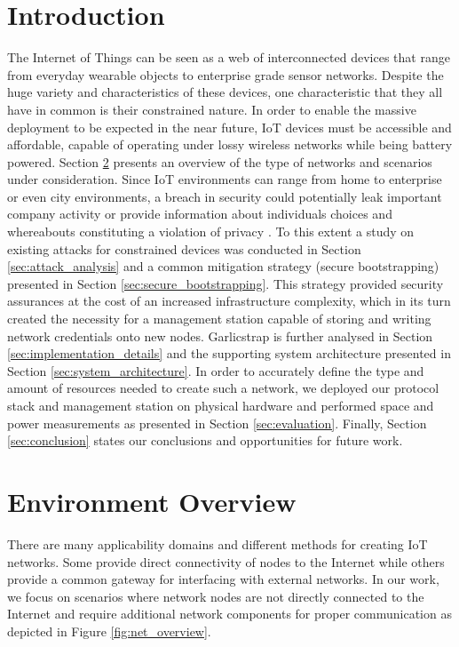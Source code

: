\documentclass{llncs}
\begin{document}
\section{Introduction}
The Internet of Things can be seen as a web of interconnected devices that range from everyday wearable objects to enterprise grade sensor networks. 
Despite the huge variety and characteristics of these devices, one characteristic that they all have in common is their constrained nature. 
In order to enable the massive deployment to be expected in the near future, \ac{IoT} devices must be accessible and affordable, capable of operating under lossy wireless networks while being battery powered. 
Section \ref{sec:network_overview} presents an overview of the type of networks and scenarios under consideration. 
Since \ac{IoT} environments can range from home to enterprise or even city environments, a breach in security could potentially leak important company activity or provide information about individuals choices and whereabouts constituting a violation of privacy \cite{Ukil2015}. 
To this extent a study on existing attacks for constrained devices was conducted in Section \ref{sec:attack_analysis} and a common mitigation strategy (secure bootstrapping) presented in Section \ref{sec:secure_bootstrapping}. 
This strategy provided security assurances at the cost of an increased infrastructure complexity, which in its turn created the necessity for a management station capable of storing and writing network credentials onto new nodes.
Garlicstrap is further analysed in Section \ref{sec:implementation_details} and the supporting system architecture presented in Section \ref{sec:system_architecture}. In order to accurately define the type and amount of resources needed to create such a network, we deployed our protocol stack and management station on physical hardware and performed space and power measurements as presented in Section \ref{sec:evaluation}. 
Finally, Section \ref{sec:conclusion} states our conclusions and opportunities for future work.

\section{Environment Overview}
\label{sec:network_overview}
There are many applicability domains and different methods for creating \ac{IoT} networks. 
Some provide direct connectivity of nodes to the Internet while others provide a common gateway for interfacing with external networks. 
In our work, we focus on scenarios where network nodes are not directly connected to the Internet and require additional network components for proper communication as depicted in Figure \ref{fig:net_overview}.
\end{document}
